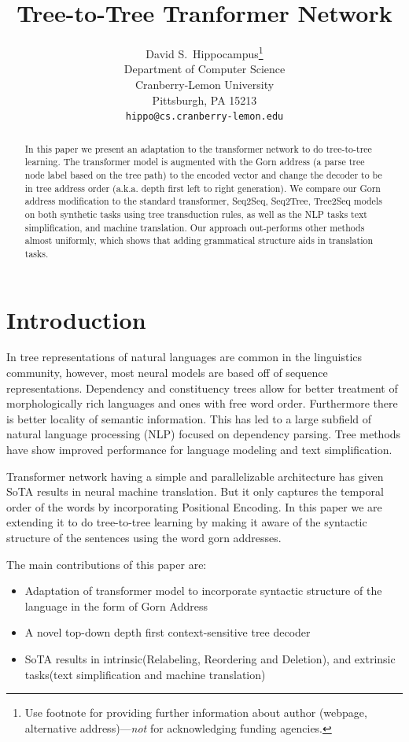 \documentclass{article}
\title{Tree-to-Tree Tranformer Network}
\author{%
  David S.~Hippocampus\thanks{Use footnote for providing further information
    about author (webpage, alternative address)---\emph{not} for acknowledging
    funding agencies.} \\
  Department of Computer Science\\
  Cranberry-Lemon University\\
  Pittsburgh, PA 15213 \\
  \texttt{hippo@cs.cranberry-lemon.edu} \\
}
\begin{document}

\maketitle

\begin{abstract}
In this paper we present an adaptation to the transformer network to do tree-to-tree learning.
The transformer model is augmented with the Gorn address (a parse tree node label based on the tree path) to the encoded vector and change the decoder to be in tree address order (a.k.a. depth first left to right generation).
We compare our Gorn address modification to the standard transformer, Seq2Seq, Seq2Tree, Tree2Seq models on both synthetic tasks using tree transduction rules, as well as the NLP tasks text simplification, and machine translation. Our approach out-performs other methods almost uniformly, which shows that adding grammatical structure aids in translation tasks.
\end{abstract}

\section{Introduction}
In tree representations of natural languages are common in the linguistics community, however, most neural models are based off of sequence representations. Dependency and constituency trees allow for better treatment of morphologically rich languages and ones with free word order.
Furthermore there is better locality of semantic information. This has led to a large subfield of natural language processing (NLP) focused on dependency parsing. Tree methods have show improved performance for language modeling and text simplification.\par Transformer network having a simple and parallelizable architecture has given SoTA results in neural machine translation. But it only captures the temporal order of the words by incorporating Positional Encoding. In this paper we are extending it to do tree-to-tree learning by making it aware of the syntactic structure of the sentences using the word gorn addresses.\par 

The main contributions of this paper are:
\begin{itemize}
\item Adaptation of transformer model to incorporate syntactic structure of the language in the form of Gorn Address
\item A novel top-down depth first context-sensitive tree decoder
\item SoTA results in intrinsic(Relabeling, Reordering and Deletion), and extrinsic tasks(text simplification and machine translation)
\end{itemize}
\end{document}
